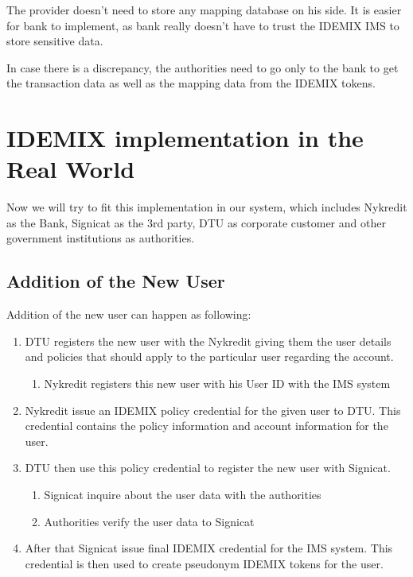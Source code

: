 The provider doesn’t need to store any mapping database on his side. It is easier for bank to implement, as bank really doesn’t have to trust the IDEMIX IMS to store sensitive data.

In case there is a discrepancy, the authorities need to go only to the bank to get the transaction data as well as the mapping data from the IDEMIX tokens.
\section {IDEMIX implementation in the Real World}
Now we will try to fit this implementation in our system, which includes Nykredit as the Bank, Signicat as the 3rd party, DTU as corporate customer and other government institutions as authorities.
\subsection{Addition of the New User}
Addition of the new user can happen as following:
\begin{enumerate}
	\item DTU registers the new user with the Nykredit giving them the user details and policies that should apply to the particular user regarding the account. 
	\begin{enumerate}
		\item Nykredit registers this new user with his User ID with the IMS system
	\end{enumerate}
	\item Nykredit issue an IDEMIX policy credential for the given user to DTU. This credential contains the policy information and account information for the user.
	\item DTU then use this policy credential to register the new user with Signicat. 
	\begin{enumerate}
		\item Signicat inquire about the user data with the authorities
		\item Authorities verify the user data to Signicat
	\end{enumerate}
	\item After that Signicat issue final IDEMIX credential for the IMS system. This credential is then used to create pseudonym IDEMIX tokens for the user. 
\end{enumerate}
